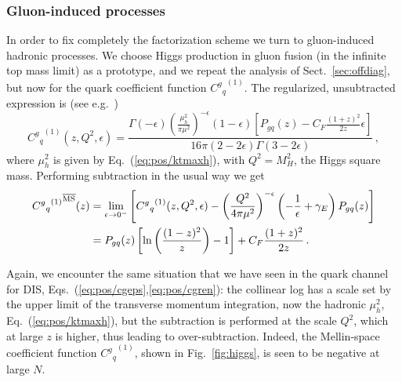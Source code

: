 \subsubsection{Gluon-induced processes}
\label{sec:higgs}
In order to fix completely the factorization scheme we turn to
gluon-induced hadronic processes. We choose Higgs production in gluon
fusion (in the infinite top mass limit) as a prototype, and we repeat the  analysis of
Sect.~\ref{sec:offdiag}, but now for the quark coefficient function
${{{C^g}_q}^{(1)}}$. The regularized, unsubtracted expression is (see
e.g.~\cite{Maltoni:2018dar}) 
\begin{equation}\label{eq:pos/cgqeps}
{C^g{}_q}^{(1)}(z,Q^2,\epsilon) =
  \frac{ \Gamma(-\epsilon)
  \left(\frac{\mu_h^2}{\pi\mu^2}\right)^{-\epsilon} (1-\epsilon) \left[P_{gq}(z) - C_F \frac{(1+z)^2}{2z} \epsilon \right]}{16\pi (2 - 2\epsilon) \Gamma (3 - 2 \epsilon)}\,,
\end{equation}
where $\mu_h^2$ is given by Eq.~(\ref{eq:pos/ktmaxh}), with $Q^2=M_H^2$,
the Higgs square mass.
Performing  \msbar{} subtraction in the usual way we get
\begin{align}\label{eq:pos/cgqren}
{  {C^g{}_q}^{(1)}}^{{\overline{\textrm{MS}}}}(z) &= \lim_{\epsilon\to
  0^-}\left[{{C^{g}}_q}^{(1)}(z,Q^2,\epsilon) - \left(\frac{Q^2}{4\pi
      \mu^2}\right)^{-\epsilon} \left(-\frac 1
    {\epsilon}+\gamma_E\right) P_{gq}(z)\right]\\
&= P_{gq}(z)\left[\ln\left(\frac{(1-z)^2}{z}\right) - 1 \right]  + C_F \frac{(1+z)^2}{2z} 
 \,.\label{eq:pos/cgqnlo}
\end{align}

Again, we encounter the same situation that we have seen in the quark
channel for DIS, Eqs.~(\ref{eq:pos/cgeps},\ref{eq:pos/cgren}): the collinear
log has a scale set by the upper limit of the transverse momentum
integration, now the hadronic $\mu_h^2$, Eq.~(\ref{eq:pos/ktmaxh}), but the
\msbar{} subtraction is performed at the scale $Q^2$, which at large $z$
is higher, thus leading to over-subtraction. Indeed, the Mellin-space
\msbar{} coefficient function  ${{{C^g}_q}^{(1)}}$, shown in
Fig.~\ref{fig:higgs}, is seen to be negative at large $N$.

